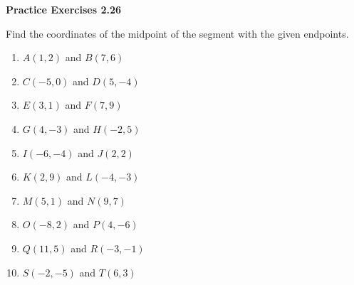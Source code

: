 \vspace{0.3ex}
\noindent\textbf{Practice Exercises 2.26}

\vspace{0.2ex}

Find the coordinates of the midpoint of the segment with the given endpoints.
\begin{multicols}{2}
\begin{enumerate}
    \item $A(1,2)$ and $B(7,6)$
    \item $C(-5,0)$ and $D(5,-4)$
    \item $E(3,1)$ and $F(7,9)$
    \item $G(4,-3)$ and $H(-2,5)$
    \item $I(-6,-4)$ and $J(2,2)$
    \item $K(2,9)$ and $L(-4,-3)$
    \item $M(5,1)$ and $N(9,7)$
    \item $O(-8,2)$ and $P(4,-6)$
    \item $Q(11,5)$ and $R(-3,-1)$
    \item $S(-2,-5)$ and $T(6,3)$
\end{enumerate}
\end{multicols}
